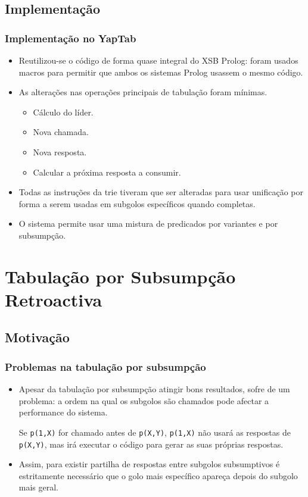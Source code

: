 \documentclass{beamer}
\begin{document}
\subsection{Implementação}

\begin{frame}
   \frametitle{Implementação no YapTab}
   \begin{itemize}
      \item Reutilizou-se o código de forma quase integral do XSB Prolog: foram usados macros para
      permitir que ambos os sistemas Prolog usassem o mesmo código.
      \item As alterações nas operações principais de tabulação foram mínimas.
      \begin{itemize}
         \pause
         \item Cálculo do líder.
         \pause
         \item Nova chamada.
         \pause
         \item Nova resposta.
         \pause
         \item Calcular a próxima resposta a consumir.
         \pause
      \end{itemize}
      \item Todas as instruções da trie tiveram que ser alteradas para usar unificação por forma a serem usadas em subgolos específicos quando completas.
      \item O sistema permite usar uma mistura de predicados por variantes e por subsumpção.
   \end{itemize}
\end{frame}

\section{Tabulação por Subsumpção Retroactiva}

\subsection{Motivação}

\begin{frame}
   \frametitle{Problemas na tabulação por subsumpção}
   \begin{itemize}
      \item Apesar da tabulação por subsumpção atingir bons resultados, sofre de um problema:
      a ordem na qual os subgolos são chamados pode afectar a performance do sistema.
      
      \begin{example}
         Se \texttt{p(1,X)} for chamado antes de \texttt{p(X,Y)}, \texttt{p(1,X)} não usará as respostas de
         \texttt{p(X,Y)}, mas irá executar o código para gerar as suas próprias respostas.
      \end{example}
      
      \item Assim, para existir partilha de respostas entre subgolos subsumptivos é estritamente necessário
      que o golo mais específico apareça depois do subgolo mais geral.
   \end{itemize}
\end{frame}
\end{document}
